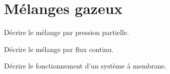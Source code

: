\documentclass[english,12pt,a4paper]{article}
\begin{document}
	\section{Mélanges gazeux}
	\begin{outline}
		\1 Décrire le mélange par pression partielle.
			\2 \hspace{-2em}\hrulefill
			\2 \hspace{-2em}\hrulefill
			\2 \hspace{-2em}\hrulefill
			\2 \hspace{-2em}\hrulefill
			\2 \hspace{-2em}\hrulefill
			\2 \hspace{-2em}\hrulefill

		\1 Décrire le mélange par flux continu.
			\2 \hspace{-2em}\hrulefill
			\2 \hspace{-2em}\hrulefill
			\2 \hspace{-2em}\hrulefill
			\2 \hspace{-2em}\hrulefill
			\2 \hspace{-2em}\hrulefill
			\2 \hspace{-2em}\hrulefill

		\1 Décrire le fonctionnement d'un système à membrane.
			\2 \hspace{-2em}\hrulefill
			\2 \hspace{-2em}\hrulefill
			\2 \hspace{-2em}\hrulefill
			\2 \hspace{-2em}\hrulefill
			\2 \hspace{-2em}\hrulefill
			\2 \hspace{-2em}\hrulefill

		\1 

	\end{outline}
	\pagebreak
\end{document}
